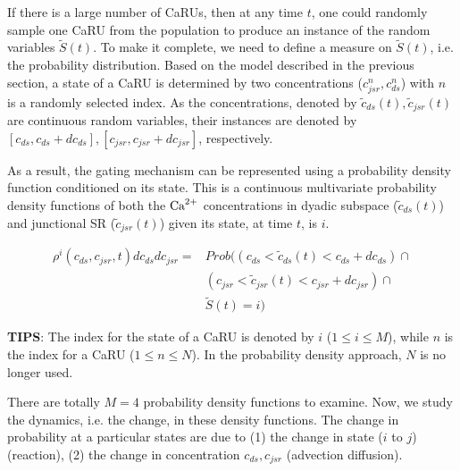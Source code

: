If there is a large number of CaRUs, then at any time $t$, one could
randomly sample one CaRU from the population to produce an instance of
the random variables $\tilde{S}(t)$. To make it complete, we need to
define a measure on $\tilde{S}(t)$, i.e. the probability
distribution. Based on the model described in the previous section, a
state of a CaRU is determined by two concentrations ($c^n_{jsr},
c^n_{ds}$) with $n$ is a randomly selected index. As the
concentrations, denoted by $\tilde{c}_{ds}(t), \tilde{c}_{jsr}(t)$ are
continuous random variables, their instances are denoted by
$[c_{ds},c_{ds}+dc_{ds}],[c_{jsr}, c_{jsr}+dc_{jsr}]$, respectively.

As a result, the gating mechanism can be represented using a
probability density function conditioned on its state. This is a
continuous multivariate probability density functions of both the
${\text{Ca}^{2+}}$ concentrations in dyadic subspace ($\tilde{c}_{ds}(t)$) and
junctional SR ($ \tilde{c}_{jsr}(t)$) given its state, at time $t$, is $i$.

\begin{eqnarray*}
  \rho^i(c_{ds},c_{jsr},t) dc_{ds}dc_{jsr} =&
  Prob((c_{ds}<\tilde{c}_{ds}(t) < c_{ds} + dc_{ds}) \cap \\
  &(c_{jsr}<\tilde{c}_{jsr}(t) < c_{jsr} + dc_{jsr}) \cap \\
  &\tilde{S}(t)=i )
\end{eqnarray*}

{\bf TIPS}: The index for the state of a CaRU is denoted by $i$ ($1\le
i \le M$), while $n$ is the index for a CaRU ($1 \le n \le N$). In the
probability density approach, $N$ is no longer used.

There are totally $M=4$ probability density functions to examine.
Now, we study the dynamics, i.e. the change, in these
density functions. The change in probability at a particular states are
due to (1) the change in state ($i$ to $j$) (reaction), (2) the change in
concentration $c_{ds}, c_{jsr}$ (advection diffusion).

